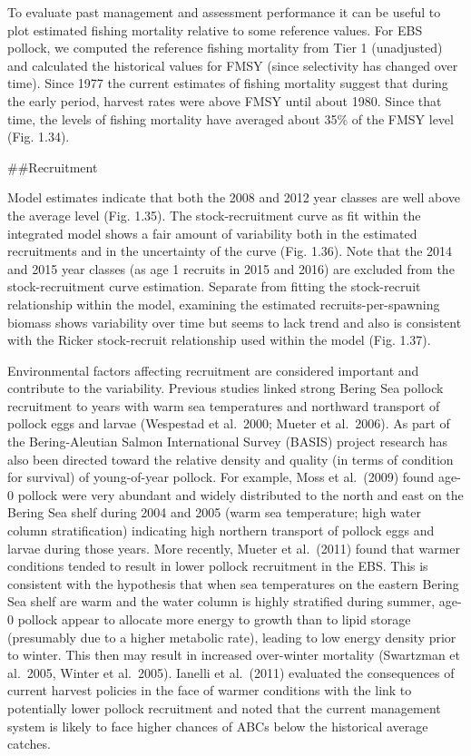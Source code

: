 To evaluate past management and assessment performance it can be useful
to plot estimated fishing mortality relative to some reference values.
For EBS pollock, we computed the reference fishing mortality from Tier 1
(unadjusted) and calculated the historical values for FMSY (since
selectivity has changed over time). Since 1977 the current estimates of
fishing mortality suggest that during the early period, harvest rates
were above FMSY until about 1980. Since that time, the levels of fishing
mortality have averaged about 35\% of the FMSY level (Fig. 1.34).

\#\#Recruitment

Model estimates indicate that both the 2008 and 2012 year classes are
well above the average level (Fig. 1.35). The stock-recruitment curve as
fit within the integrated model shows a fair amount of variability both
in the estimated recruitments and in the uncertainty of the curve (Fig.
1.36). Note that the 2014 and 2015 year classes (as age 1 recruits in
2015 and 2016) are excluded from the stock-recruitment curve estimation.
Separate from fitting the stock-recruit relationship within the model,
examining the estimated recruits-per-spawning biomass shows variability
over time but seems to lack trend and also is consistent with the Ricker
stock-recruit relationship used within the model (Fig. 1.37).

Environmental factors affecting recruitment are considered important and
contribute to the variability. Previous studies linked strong Bering Sea
pollock recruitment to years with warm sea temperatures and northward
transport of pollock eggs and larvae (Wespestad et al.~2000; Mueter et
al.~2006). As part of the Bering-Aleutian Salmon International Survey
(BASIS) project research has also been directed toward the relative
density and quality (in terms of condition for survival) of
young-of-year pollock. For example, Moss et al.~(2009) found age-0
pollock were very abundant and widely distributed to the north and east
on the Bering Sea shelf during 2004 and 2005 (warm sea temperature; high
water column stratification) indicating high northern transport of
pollock eggs and larvae during those years. More recently, Mueter et
al.~(2011) found that warmer conditions tended to result in lower
pollock recruitment in the EBS. This is consistent with the hypothesis
that when sea temperatures on the eastern Bering Sea shelf are warm and
the water column is highly stratified during summer, age-0 pollock
appear to allocate more energy to growth than to lipid storage
(presumably due to a higher metabolic rate), leading to low energy
density prior to winter. This then may result in increased over-winter
mortality (Swartzman et al.~2005, Winter et al.~2005). Ianelli et
al.~(2011) evaluated the consequences of current harvest policies in the
face of warmer conditions with the link to potentially lower pollock
recruitment and noted that the current management system is likely to
face higher chances of ABCs below the historical average catches.

